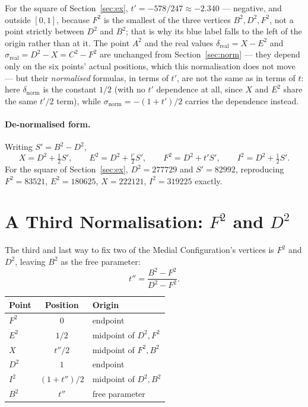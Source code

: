 \documentclass[12pt]{article}
\theoremstyle{remark}
\begin{document}
For the square of Section~\ref{sec:ex}, $t' = -578/247 \approx -2.340$
--- negative, and outside $[0,1]$, because $F^2$ is the smallest of
the three vertices $B^2, D^2, F^2$, not a point strictly between $D^2$
and $B^2$; that is why its blue label falls to the left of the origin
rather than at it. The point $A^2$ and the real values
$\delta_{\text{real}} = X - E^2$ and
$\sigma_{\text{real}} = D^2 - X = C^2 - F^2$ are unchanged from
Section~\ref{sec:norm} --- they depend only on the six points' actual
positions, which this normalisation does not move --- but their
\emph{normalised} formulas, in terms of $t'$, are not the same as in
terms of $t$: here $\delta_{\text{norm}}$ is the constant $1/2$ (with
no $t'$ dependence at all, since $X$ and $E^2$ share the same $t'/2$
term), while $\sigma_{\text{norm}} = -(1+t')/2$ carries the dependence
instead.

\paragraph{De-normalised form.}
Writing $S' = B^2 - D^2$,
\[
X = D^2 + \tfrac12 S', \qquad
E^2 = D^2 + \tfrac{t'}{2} S', \qquad
F^2 = D^2 + t'S', \qquad
I^2 = D^2 + \tfrac12 S' .
\]
For the square of Section~\ref{sec:ex}, $D^2 = 277729$ and
$S' = 82992$, reproducing $F^2 = 83521$, $E^2 = 180625$,
$X = 222121$, $I^2 = 319225$ exactly.

\section{A Third Normalisation: $F^2$ and $D^2$}\label{sec:norm3}

The third and last way to fix two of the Medial Configuration's
vertices is $F^2$ and $D^2$, leaving $B^2$ as the free parameter:
\[
t'' = \frac{B^2 - F^2}{D^2 - F^2}.
\]

\begin{center}
\begin{tabular}{lcl}
\hline
Point & Position & Origin \\
\hline
$F^2$ & $0$          & endpoint \\
$E^2$ & $1/2$        & midpoint of $D^2, F^2$ \\
$X$   & $t''/2$      & midpoint of $F^2, B^2$ \\
$D^2$ & $1$          & endpoint \\
$I^2$ & $(1+t'')/2$  & midpoint of $D^2, B^2$ \\
$B^2$ & $t''$        & free parameter \\
\hline
\end{tabular}
\end{center}
\end{document}

